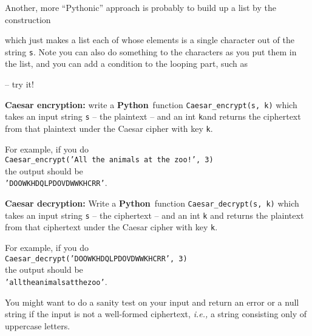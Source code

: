 \documentclass[12pt,letterpaper]{amsbook}
\theoremstyle{definition}
\theoremstyle{remark}
\numberwithin{figure}{section}
\numberwithin{exercise}{chapter}
\numberwithin{section}{chapter}
\numberwithin{equation}{section}
\numberwithin{table}{subsection}
\newcommand{\code}[1]{\colorbox{lg}{\texttt{#1}}}
\newcommand{\Python}{{\textbf{\ix{Python}}}}
\newcommand{\ix}[1]{{#1}\index{#1}}
\begin{document}
Another, more ``Pythonic'' approach is probably to build up a list by the
construction\\
\noindent\begin{codedisp}
  [ c for c in s ]
\end{codedisp}

\noindent which just makes a list each of whose elements is a single character out of
the string \code{s}.  Note you can also do something to the characters
as you put them in the list, and you can add a condition to the looping part,
such as\\
\begin{codedisp}
\end{codedisp}

\noindent -- try it!

\vskip2mm
\begin{CTtcb}[label=ct:Caesarencrypt]{}{}
  \textbf{Caesar encryption:} write a \Python\ function
  \code{Caesar\_encrypt(s, k)} which takes an input string \code{s} --
  the plaintext -- and an int \code{k}and returns the ciphertext from
  that plaintext under the Caesar cipher with key \code{k}.

  For example, if you do\\
  \hphantom{XXX}\code{Caesar\_encrypt('All the animals at the zoo!', 3)}\\
  the output should be\\
  \hphantom{XXX}\code{'DOOWKHDQLPDOVDWWKHCRR'}.
\end{CTtcb}

\vskip2mm
\begin{CTtcb}[label=ct:Caesardecrypt]{}{}
  \textbf{Caesar decryption:} Write a \Python\ function
  \code{Caesar\_decrypt(s, k)} which takes an input string \code{s} --
  the ciphertext -- and an int \code{k} and returns the plaintext from
  that ciphertext under the Caesar cipher with key \code{k}.

  For example, if you do\\
  \hphantom{XXX}\code{Caesar\_decrypt('DOOWKHDQLPDOVDWWKHCRR', 3)}\\
  the output should be\\
  \hphantom{XXX}\code{'alltheanimalsatthezoo'}.

  You might want to do a sanity test on your input and return an error or a
  null string if the input is not a well-formed ciphertext, \textit{i.e.,} a
  string consisting only of uppercase letters.
\end{CTtcb}
\end{document}
